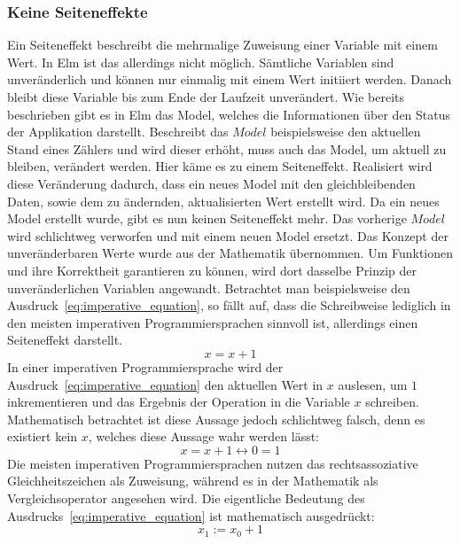 \subsubsection{Keine Seiteneffekte}
\label{sec:Keine Seiteneffekte}
Ein Seiteneffekt beschreibt die mehrmalige Zuweisung einer Variable mit einem Wert. In Elm ist das allerdings nicht möglich. Sämtliche Variablen sind unveränderlich und können nur einmalig mit einem Wert initiiert werden. Danach bleibt diese Variable bis zum Ende der Laufzeit unverändert. Wie bereits beschrieben gibt es in Elm das Model, welches die Informationen über den Status der Applikation darstellt. Beschreibt das $Model$ beispielsweise den aktuellen Stand eines Zählers und wird dieser erhöht, muss auch das Model, um aktuell zu bleiben, verändert werden. Hier käme es zu einem Seiteneffekt. Realisiert wird diese Veränderung dadurch, dass ein neues Model mit den gleichbleibenden Daten, sowie dem zu ändernden, aktualisierten Wert erstellt wird. Da ein neues Model erstellt wurde, gibt es nun keinen Seiteneffekt mehr. Das vorherige $Model$ wird schlichtweg verworfen und mit einem neuen Model ersetzt.
Das Konzept der unveränderbaren Werte wurde aus der Mathematik übernommen.  Um Funktionen und ihre Korrektheit garantieren zu können, wird dort dasselbe Prinzip der unveränderlichen Variablen angewandt. Betrachtet man beispielsweise den Ausdruck~\ref{eq:imperative_equation}, so fällt auf, dass die Schreibweise lediglich in den meisten imperativen Programmiersprachen sinnvoll ist, allerdings einen Seiteneffekt darstellt.
\begin{equation} \label{eq:imperative_equation}
x = x + 1
\end{equation}
In einer imperativen Programmiersprache wird der Ausdruck~\ref{eq:imperative_equation} den aktuellen Wert in $x$ auslesen, um $1$ inkrementieren und das Ergebnis der Operation in die Variable $x$ schreiben.
Mathematisch betrachtet ist diese Aussage jedoch schlichtweg falsch, denn es existiert kein $x$, welches diese Aussage wahr werden lässt:
\begin{equation} \label{eq:mathematical_equation}
x=x+1 \leftrightarrow 0=1
\end{equation}
Die meisten imperativen Programmiersprachen nutzen das rechtsassoziative Gleichheitszeichen als Zuweisung, während es in der Mathematik als Vergleichsoperator angesehen wird.
Die eigentliche Bedeutung des Ausdrucks~\ref{eq:imperative_equation} ist mathematisch ausgedrückt:
\begin{equation} \label{eq:true_equation}
x_1:= x_0 + 1
\end{equation}
